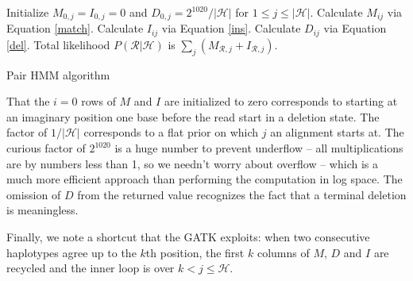 \documentclass[nofootinbib,amssymb,amsmath]{revtex4}
\newcommand{\mc}[1]{\mathcal{#1}}
\begin{document}
\begin{algorithm}
\begin{algorithmic}[1]
\State Initialize $M_{0,j} = I_{0,j} = 0$ and $D_{0,j} = 2^{1020}/|\mc{H}|$ for $1 \le j \le |\mc{H}|$.
\For{$1 \le i \le | \mc{R} |$}
	\For{$1 \le j \le | \mc{H} |$}
		\State Calculate $M_{ij}$ via Equation \ref{match}.
		\State Calculate $I_{ij}$ via Equation \ref{ins}.
		\State Calculate $D_{ij}$ via Equation \ref{del}.
	\EndFor
\EndFor
\State Total likelihood $P(\mc{R} | \mc{H})$ is $\sum_j \left(M_{\mc{R},j} + I_{\mc{R},j} \right)$.
\end{algorithmic}
\caption{Pair HMM algorithm}
\label{pairHMM}
\end{algorithm}

That the $i = 0$ rows of $M$ and $I$ are initialized to zero corresponds to starting at an imaginary position one base before the read start in a deletion state.  The factor of $1/|\mc{H}|$ corresponds to a flat prior on which $j$ an alignment starts at.  The curious factor of $2^{1020}$ is a huge number to prevent underflow -- all multiplications are by numbers less than 1, so we needn't worry about overflow -- which is a much more efficient approach than performing the computation in log space.  The omission of $D$ from the returned value recognizes the fact that a terminal deletion is meaningless.

Finally, we note a shortcut that the GATK exploits: when two consecutive haplotypes agree up to the $k$th position, the first $k$ columns of $M$, $D$ and $I$ are recycled and the inner loop is over $k < j \le \mc{H}$.
\end{document}
